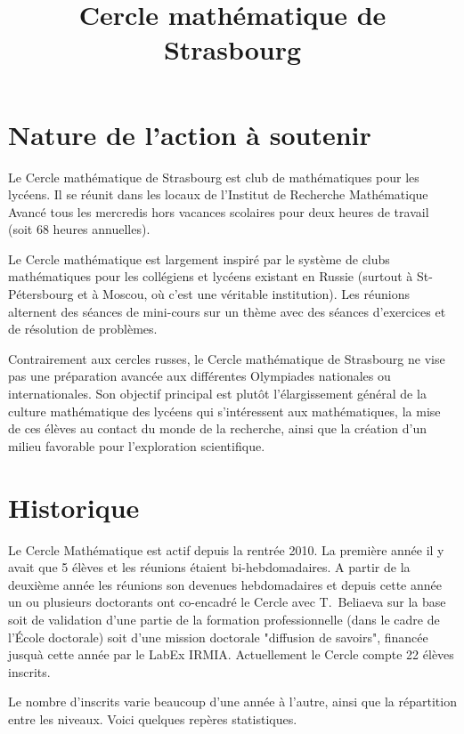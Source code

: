 \documentclass[11pt,notitlepage]{article}
\title{Cercle math\'ematique de Strasbourg}
\date{}
\begin{document}
\maketitle

\section{Nature de l'action \`a soutenir}
 
 Le Cercle math\'ematique de Strasbourg est club de math\'ematiques pour les lyc\'eens. 
 Il se r\'eunit dans les locaux de l'Institut de Recherche Mathématique Avancé tous  les mercredis hors vacances scolaires pour deux heures de travail (soit 68 heures annuelles).
 
 Le Cercle math\'ematique est largement inspir\'e par le syst\`eme de
 clubs math\'ematiques pour les coll\'egiens et lyc\'eens existant en
 Russie (surtout \`a St-P\'etersbourg et \`a Moscou, o\`u c'est une  v\'eritable institution). Les r\'eunions alternent des s\'eances de mini-cours sur un th\`eme avec des s\'eances d'exercices et de r\'esolution de probl\`emes. 
 
 Contrairement aux cercles russes, le Cercle math\'ematique de
 Strasbourg ne vise pas une pr\'eparation avanc\'ee aux diff\'erentes
 Olympiades nationales ou internationales. Son objectif principal est
 plut\^ot l'\'elargissement g\'en\'eral de la culture math\'ematique des
 lyc\'eens qui s'int\'eressent aux math\'e\-matiques, la mise de ces
 \'el\`eves au contact du monde de la recherche, ainsi que la cr\'eation d'un milieu favorable pour l'exploration scientifique.
 

\section{Historique}
Le Cercle Math\'ematique est actif depuis la rentr\'ee 2010. La premi\`ere ann\'ee il y avait que 5 \'el\`eves et les r\'eunions \'etaient bi-hebdomadaires. A partir de la deuxi\`eme ann\'ee les r\'eunions son devenues hebdomadaires et depuis cette ann\'ee un ou plusieurs doctorants ont co-encadr\'e le Cercle avec T.~Beliaeva sur la base soit de validation d'une partie de la formation professionnelle (dans le cadre de l'\'Ecole doctorale) soit d'une mission doctorale "diffusion de savoirs", financ\'ee jusqu\`a cette ann\'ee par le LabEx IRMIA. Actuellement le Cercle  compte 22 \'el\`eves inscrits.

Le nombre d'inscrits varie beaucoup d'une ann\'ee \`a l'autre, ainsi que la r\'epartition entre les niveaux. Voici quelques rep\`eres statistiques.
\end{document}
